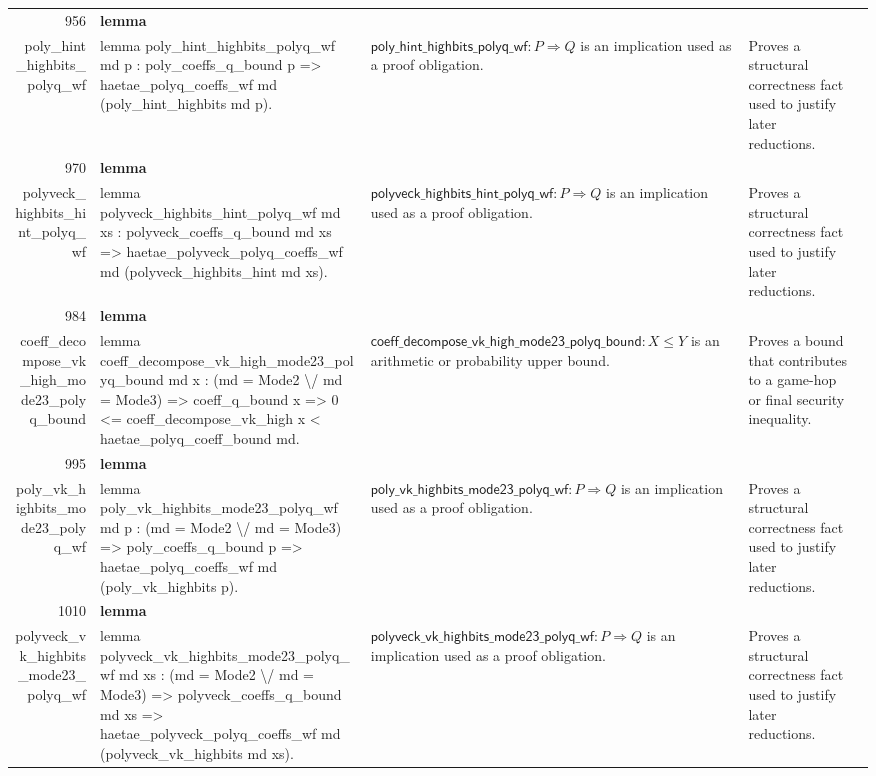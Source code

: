 \documentclass[10pt]{article}
\newcommand{\ec}[1]{\begingroup\ttfamily\scriptsize #1\endgroup}
\begin{document}
\begin{longtable}{r L{0.17\textwidth} L{0.26\textwidth} L{0.27\textwidth} L{0.20\textwidth}}
956 & \textbf{lemma}\\\ec{poly\_hint\_highbits\_polyq\_wf} & \ec{lemma poly\_hint\_highbits\_polyq\_wf md p : poly\_coeffs\_q\_bound p => haetae\_polyq\_coeffs\_wf md (poly\_hint\_highbits md p).} & \(\mathsf{poly\_hint\_highbits\_polyq\_wf} : P \Rightarrow Q\) is an implication used as a proof obligation. & Proves a structural correctness fact used to justify later reductions. \\
970 & \textbf{lemma}\\\ec{polyveck\_highbits\_hint\_polyq\_wf} & \ec{lemma polyveck\_highbits\_hint\_polyq\_wf md xs : polyveck\_coeffs\_q\_bound md xs => haetae\_polyveck\_polyq\_coeffs\_wf md (polyveck\_highbits\_hint md xs).} & \(\mathsf{polyveck\_highbits\_hint\_polyq\_wf} : P \Rightarrow Q\) is an implication used as a proof obligation. & Proves a structural correctness fact used to justify later reductions. \\
984 & \textbf{lemma}\\\ec{coeff\_decompose\_vk\_high\_mode23\_polyq\_bound} & \ec{lemma coeff\_decompose\_vk\_high\_mode23\_polyq\_bound md x : (md = Mode2 \textbackslash{}/ md = Mode3) => coeff\_q\_bound x => 0 <= coeff\_decompose\_vk\_high x < haetae\_polyq\_coeff\_bound md.} & \(\mathsf{coeff\_decompose\_vk\_high\_mode23\_polyq\_bound} : X \le Y\) is an arithmetic or probability upper bound. & Proves a bound that contributes to a game-hop or final security inequality. \\
995 & \textbf{lemma}\\\ec{poly\_vk\_highbits\_mode23\_polyq\_wf} & \ec{lemma poly\_vk\_highbits\_mode23\_polyq\_wf md p : (md = Mode2 \textbackslash{}/ md = Mode3) => poly\_coeffs\_q\_bound p => haetae\_polyq\_coeffs\_wf md (poly\_vk\_highbits p).} & \(\mathsf{poly\_vk\_highbits\_mode23\_polyq\_wf} : P \Rightarrow Q\) is an implication used as a proof obligation. & Proves a structural correctness fact used to justify later reductions. \\
1010 & \textbf{lemma}\\\ec{polyveck\_vk\_highbits\_mode23\_polyq\_wf} & \ec{lemma polyveck\_vk\_highbits\_mode23\_polyq\_wf md xs : (md = Mode2 \textbackslash{}/ md = Mode3) => polyveck\_coeffs\_q\_bound md xs => haetae\_polyveck\_polyq\_coeffs\_wf md (polyveck\_vk\_highbits md xs).} & \(\mathsf{polyveck\_vk\_highbits\_mode23\_polyq\_wf} : P \Rightarrow Q\) is an implication used as a proof obligation. & Proves a structural correctness fact used to justify later reductions. \\

\end{longtable}
\end{document}
